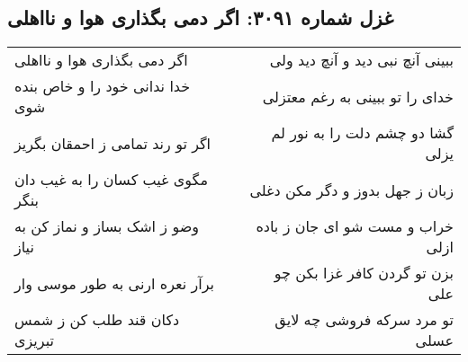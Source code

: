 \begin{center}
\section*{غزل شماره ۳۰۹۱: اگر دمی بگذاری هوا و نااهلی}
\label{sec:3091}
\begin{longtable}{l p{0.5cm} r}
اگر دمی بگذاری هوا و نااهلی
&&
ببینی آنچ نبی دید و آنچ دید ولی
\\
خدا ندانی خود را و خاص بنده شوی
&&
خدای را تو ببینی به رغم معتزلی
\\
اگر تو رند تمامی ز احمقان بگریز
&&
گشا دو چشم دلت را به نور لم یزلی
\\
مگوی غیب کسان را به غیب دان بنگر
&&
زبان ز جهل بدوز و دگر مکن دغلی
\\
وضو ز اشک بساز و نماز کن به نیاز
&&
خراب و مست شو ای جان ز باده ازلی
\\
برآر نعره ارنی به طور موسی وار
&&
بزن تو گردن کافر غزا بکن چو علی
\\
دکان قند طلب کن ز شمس تبریزی
&&
تو مرد سرکه فروشی چه لایق عسلی
\\
\end{longtable}
\end{center}
